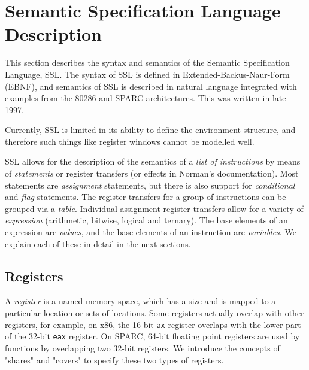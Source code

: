 \section{Semantic Specification Language Description} 
This section describes the syntax and semantics of the Semantic
Specification Language, SSL. The syntax of SSL is defined in
Extended-Backus-Naur-Form (EBNF), and semantics of SSL is described in
natural language integrated with examples from the 80286 and SPARC
architectures.  This was written in late 1997.  
 
Currently, SSL is limited in its ability to define the environment 
structure, and therefore such things like register windows cannot 
be modelled well. 
 
SSL allows for the description of the semantics of a \emph{list of
instructions} by means of \emph{statements} or register transfers
(or effects in Norman's documentation).  Most statements are
\emph{assignment} statements, but there is also support for
\emph{conditional} and \emph{flag} statements.  The register transfers 
for a group of instructions can be grouped via a \emph{table}. 
Individual assignment register transfers allow for a variety of
\emph{expression} (arithmetic, bitwise, logical and ternary). 
The base elements of an expression are \emph{values}, and the 
base elements of an instruction are \emph{variables}.  
We explain each of these in detail in the next sections.


\subsection{Registers}
A \emph{register} is a named memory space, which has a size and is 
mapped to a particular location or sets of locations. 
Some registers actually overlap with other registers, for example,
on x86, the 16-bit \texttt{ax} register overlaps with the lower part
of the 32-bit \texttt{eax} register.  On SPARC, 64-bit floating 
point registers are used by functions by overlapping two 32-bit 
registers.  We introduce the concepts of "shares" and "covers" to 
specify these two types of registers. 

